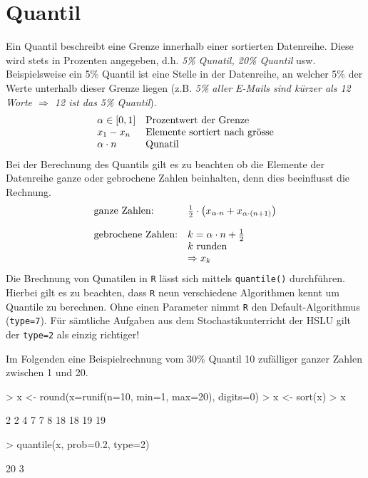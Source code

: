 \section{Quantil}
Ein \gls{Quantil} beschreibt eine Grenze innerhalb einer sortierten 
Datenreihe. Diese wird stets in Prozenten angegeben, d.h. 
\emph{5\% Qunatil, 20\% Quantil} usw. 
Beispielsweise ein 5\% Quantil ist eine Stelle in der Datenreihe, an 
welcher 5\% der Werte unterhalb dieser Grenze liegen (z.B. \emph{5\% 
aller E-Mails sind kürzer als 12 Worte $\Rightarrow$ 12 ist das 5\%
Quantil}).
\[ \begin{array}{l l}
	\alpha \in [0, 1] 
		& \text{Prozentwert der Grenze} \\
	x_1 - x_n
		& \text{Elemente sortiert nach grösse} \\
	\alpha \cdot n 
		& \text{Qunatil} \\
\end{array} \]
Bei der Berechnung des Quantils gilt es zu beachten ob die Elemente 
der Datenreihe ganze oder gebrochene Zahlen beinhalten, denn dies 
beeinflusst die Rechnung.
\[ \begin{array}{l l}
	\text{ganze Zahlen:}
		& \frac{1}{2} \cdot \left(
			x_{\alpha \cdot n} 
			+ x_{\alpha \cdot (n + 1)} \right)  \\
	& \\
	\text{gebrochene Zahlen:}
		& k = \alpha \cdot n + \frac{1}{2}  \\
		& k \text{ runden} \\
		& \Rightarrow x_{k}
\end{array} \]
Die Brechnung von Qunatilen in \lstinline{R} lässt sich mittels 
\lstinline{quantile()} durchführen. Hierbei gilt es zu beachten, dass
\lstinline{R} neun verschiedene Algorithmen kennt um Quantile zu 
berechnen. Ohne einen Parameter nimmt \lstinline{R} den 
Default-Algorithmus (\lstinline{type=7}). Für sämtliche Aufgaben aus dem
Stochastikunterricht der HSLU gilt der \lstinline{type=2} als einzig
richtiger! 

Im Folgenden eine Beispielrechnung vom 30\% \gls{Quantil} 10 zufälliger 
ganzer Zahlen zwischen 1 und 20.
\begin{Schunk}
\begin{Sinput}
> x <- round(x=runif(n=10, min=1, max=20), digits=0)
> x <- sort(x)
> x
\end{Sinput}
\begin{Soutput}
 [1]  2  2  4  7  7  8 18 18 19 19
\end{Soutput}
\begin{Sinput}
> quantile(x, prob=0.2, type=2)
\end{Sinput}
\begin{Soutput}
20%
  3 
\end{Soutput}
\end{Schunk}

